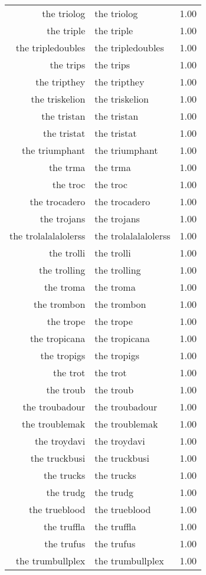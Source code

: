\begin{table}[ht]
\begin{tabular}{rlr}
  the triolog & the triolog & 1.00 \\ 
  the triple & the triple & 1.00 \\ 
  the tripledoubles & the tripledoubles & 1.00 \\ 
  the trips & the trips & 1.00 \\ 
  the tripthey & the tripthey & 1.00 \\ 
  the triskelion & the triskelion & 1.00 \\ 
  the tristan & the tristan & 1.00 \\ 
  the tristat & the tristat & 1.00 \\ 
  the triumphant & the triumphant & 1.00 \\ 
  the trma & the trma & 1.00 \\ 
  the troc & the troc & 1.00 \\ 
  the trocadero & the trocadero & 1.00 \\ 
  the trojans & the trojans & 1.00 \\ 
  the trolalalalolerss & the trolalalalolerss & 1.00 \\ 
  the trolli & the trolli & 1.00 \\ 
  the trolling & the trolling & 1.00 \\ 
  the troma & the troma & 1.00 \\ 
  the trombon & the trombon & 1.00 \\ 
  the trope & the trope & 1.00 \\ 
  the tropicana & the tropicana & 1.00 \\ 
  the tropigs & the tropigs & 1.00 \\ 
  the trot & the trot & 1.00 \\ 
  the troub & the troub & 1.00 \\ 
  the troubadour & the troubadour & 1.00 \\ 
  the troublemak & the troublemak & 1.00 \\ 
  the troydavi & the troydavi & 1.00 \\ 
  the truckbusi & the truckbusi & 1.00 \\ 
  the trucks & the trucks & 1.00 \\ 
  the trudg & the trudg & 1.00 \\ 
  the trueblood & the trueblood & 1.00 \\ 
  the truffla & the truffla & 1.00 \\ 
  the trufus & the trufus & 1.00 \\ 
  the trumbullplex & the trumbullplex & 1.00 \\ 

\end{tabular}
\end{table}
